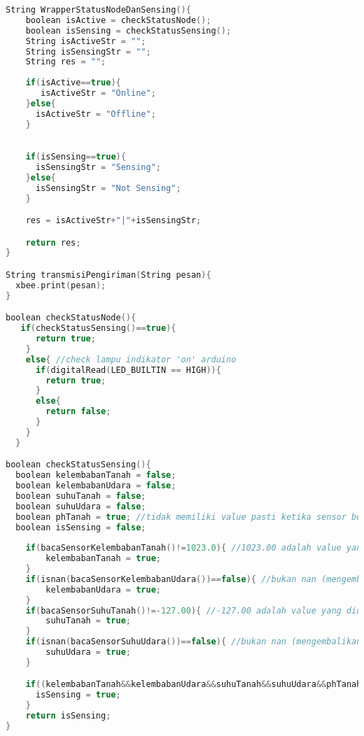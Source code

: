 \begin{lstlisting}[language=C++, caption=Node.ino]
String WrapperStatusNodeDanSensing(){
    boolean isActive = checkStatusNode();
    boolean isSensing = checkStatusSensing();
    String isActiveStr = "";
    String isSensingStr = "";
    String res = "";
    
    if(isActive==true){
       isActiveStr = "Online";
    }else{
      isActiveStr = "Offline";
    }

    
    if(isSensing==true){
      isSensingStr = "Sensing";
    }else{
      isSensingStr = "Not Sensing";
    }

    res = isActiveStr+"|"+isSensingStr;

    return res;
}

String transmisiPengiriman(String pesan){
  xbee.print(pesan);
}

boolean checkStatusNode(){
   if(checkStatusSensing()==true){
      return true;
    }
    else{ //check lampu indikator 'on' arduino
      if(digitalRead(LED_BUILTIN == HIGH)){
        return true;  
      }
      else{
        return false;  
      }
    }
  }

boolean checkStatusSensing(){
  boolean kelembabanTanah = false;
  boolean kelembabanUdara = false;
  boolean suhuTanah = false;
  boolean suhuUdara = false;
  boolean phTanah = true; //tidak memiliki value pasti ketika sensor bermasalah
  boolean isSensing = false;
  
    if(bacaSensorKelembabanTanah()!=1023.0){ //1023.00 adalah value yang didapatkan jika sensor suhu tanah bermasalah
        kelembabanTanah = true;
    }
    if(isnan(bacaSensorKelembabanUdara())==false){ //bukan nan (mengembalikan value), jika bermasalah value = nan
        kelembabanUdara = true;
    }
    if(bacaSensorSuhuTanah()!=-127.00){ //-127.00 adalah value yang didapatkan jika sensor suhu tanah bermasalah
        suhuTanah = true;
    }
    if(isnan(bacaSensorSuhuUdara())==false){ //bukan nan (mengembalikan value), jika bermasalah value = nan
        suhuUdara = true;
    }

    if((kelembabanTanah&&kelembabanUdara&&suhuTanah&&suhuUdara&&phTanah)==true){
      isSensing = true;
    }
    return isSensing;
}

\end{lstlisting}

%  



